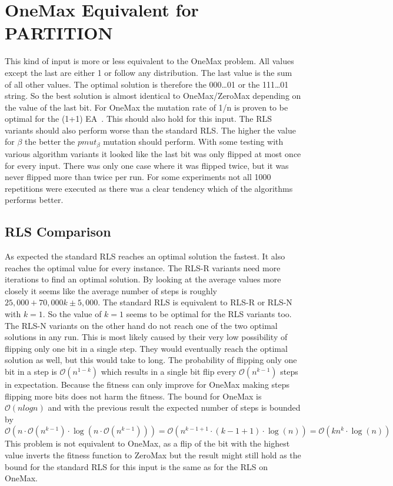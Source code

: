 \section{OneMax Equivalent for PARTITION}
This kind of input is more or less equivalent to the OneMax problem. All values except the last are either 1 or follow any distribution. The last value is the sum of all other values. The optimal solution is therefore the 000\dots01 or
the 111\dots01 string. So the best solution is almost identical to OneMax/ZeroMax depending on the value of the last bit.\newline
For OneMax the mutation rate of 1/n is proven to be optimal for the (1+1) EA~\cite{witt2013tight}.
This should also hold for this input.
The RLS variants should also perform worse than the standard RLS.
The higher the value for $\beta$ the better the $pmut_\beta$ mutation should perform.
With some testing with various algorithm variants it looked like the last bit was only flipped at most once for every input.
There was only one case where it was flipped twice, but it was never flipped more than twice per run.\newline
For some experiments not all 1000 repetitions were executed as there was a clear tendency which of the algorithms performs better.
\subsection{RLS Comparison}




As expected the standard RLS reaches an optimal solution the fastest.
It also reaches the optimal value for every instance.
The RLS-R variants need more iterations to find an optimal solution.
By looking at the average values more closely it seems like the average number of steps is roughly $25,000 + 70,000k \pm 5,000$.
The standard RLS is equivalent to RLS-R or RLS-N with $k=1$.
So the value of $k=1$ seems to be optimal for the RLS variants too.
The RLS-N variants on the other hand do not reach one of the two optimal solutions in any run.
This is most likely caused by their very low possibility of flipping only one bit in a single step.
They would eventually reach the optimal solution as well, but this would take to long.
The probability of flipping only one bit in a step is $\mathcal{O}(n^{1-k})$ which results in a single bit flip every $\mathcal{O}(n^{k-1})$ steps in expectation.
Because the fitness can only improve for OneMax making steps flipping more bits does not harm the fitness.
The bound for OneMax is $\mathcal{O}(nlogn)$ and with the previous result the expected number of steps is bounded by
$\mathcal{O}(n\cdot\mathcal{O}(n^{k-1})\cdot \log(n\cdot\mathcal{O}(n^{k-1}))) 
=\mathcal{O}(n^{k-1+1}\cdot (k-1+1)\cdot\log(n))
=\mathcal{O}(kn^{k}\cdot\log(n))$
This problem is not equivalent to OneMax, as a flip of the bit with the highest value inverts the fitness function to ZeroMax but the result might still hold as the bound for the standard RLS for this input is the same as for the RLS on OneMax.

